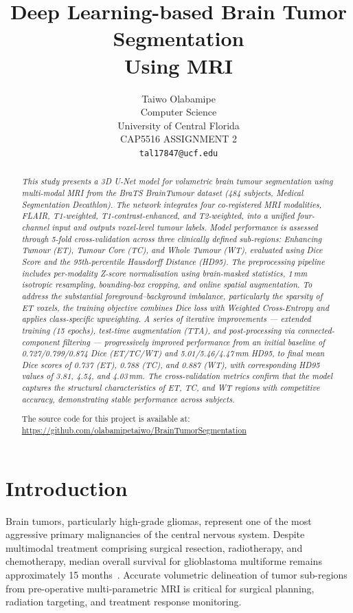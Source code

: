 \documentclass[10pt,twocolumn]{article}
\title{\textbf{Deep Learning-based Brain Tumor Segmentation\\Using MRI}}
\author{
  Taiwo Olabamipe \\
  Computer Science \\
  University of Central Florida \\
  CAP5516 ASSIGNMENT 2 \\
  \texttt{tal17847@ucf.edu}
}
\date{}
\begin{document}
\maketitle

\begin{abstract}
\textit{
This study presents a 3D U-Net model for volumetric brain tumour segmentation using multi-modal MRI from the BraTS BrainTumour dataset (484 subjects, Medical Segmentation Decathlon). The network integrates four co-registered MRI modalities, FLAIR, T1-weighted, T1-contrast-enhanced, and T2-weighted, into a unified four-channel input and outputs voxel-level tumour labels. Model performance is assessed through 5-fold cross-validation across three clinically defined sub-regions: Enhancing Tumour (ET), Tumour Core (TC), and Whole Tumour (WT), evaluated using Dice Score and the 95th-percentile Hausdorff Distance (HD95). The preprocessing pipeline includes per-modality Z-score normalisation using brain-masked statistics, 1\,mm isotropic resampling, bounding-box cropping, and online spatial augmentation. To address the substantial foreground--background imbalance, particularly the sparsity of ET voxels, the training objective combines Dice loss with Weighted Cross-Entropy and applies class-specific upweighting. A series of iterative improvements --- extended training (15 epochs), test-time augmentation (TTA), and post-processing via connected-component filtering --- progressively improved performance from an initial baseline of 0.727/0.799/0.874 Dice (ET/TC/WT) and 5.01/5.46/4.47\,mm HD95, to final mean Dice scores of 0.737 (ET), 0.788 (TC), and 0.887 (WT), with corresponding HD95 values of 3.81, 4.54, and 4.03\,mm. The cross-validation metrics confirm that the model captures the structural characteristics of ET, TC, and WT regions with competitive accuracy, demonstrating stable performance across subjects.
}

\medskip
The source code for this project is available at:
\url{https://github.com/olabamipetaiwo/BrainTumorSegmentation}
\end{abstract}

\section{Introduction}

Brain tumors, particularly high-grade gliomas, represent one of
the most aggressive primary malignancies of the central nervous
system. Despite multimodal treatment comprising surgical
resection, radiotherapy, and chemotherapy, median overall
survival for glioblastoma multiforme remains approximately 15
months~\cite{menze2015}. Accurate volumetric delineation of tumor
sub-regions from pre-operative multi-parametric MRI is critical
for surgical planning, radiation targeting, and treatment response
monitoring.
\end{document}
